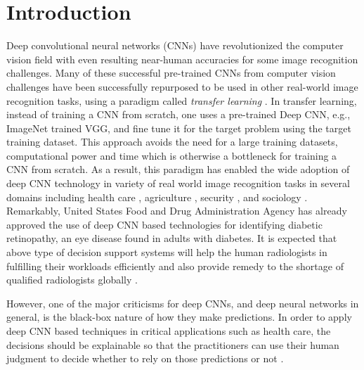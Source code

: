 \section{Introduction}
Deep convolutional neural networks (CNNs) \cite{alexnet, vggnet} have revolutionized the computer vision field with even resulting near-human accuracies for some image recognition challenges.
Many of these successful pre-trained CNNs from computer vision challenges have been successfully repurposed to be used in other real-world image recognition tasks, using a paradigm called \textit{transfer learning} \cite{transfer-learning-factors}.
In transfer learning, instead of training a CNN from scratch, one uses a pre-trained Deep CNN, e.g., ImageNet trained VGG, and fine tune it for the target problem using the target training dataset.
This approach avoids the need for a large training datasets, computational power and time which is otherwise a bottleneck for training a CNN from scratch.
As a result, this paradigm has enabled the wide adoption of deep CNN technology in variety of real world image recognition tasks in several domains including health care \cite{kermany2018identifying, islam2017abnormality}, agriculture \cite{mohanty2016using}, security \cite{arbabzadah2016identifying}, and sociology \cite{wang2017deep}.
Remarkably, United States Food and Drug Administration Agency has already approved the use of deep CNN based technologies for identifying diabetic retinopathy, an eye disease found in adults with diabetes.
It is expected that above type of decision support systems will help the human radiologists in fulfilling their workloads efficiently and also provide remedy to the shortage of qualified radiologists globally \cite{radiologistshortage}.

However, one of the major criticisms for deep CNNs, and deep neural networks in general, is the black-box nature of how they make predictions.
In order to apply deep CNN based techniques in critical applications such as health care, the decisions should be explainable so that the practitioners can use their human judgment to decide whether to rely on those predictions or not \cite{jung2017deep}.


